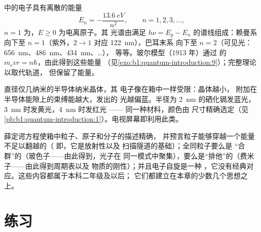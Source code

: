 \begin{proposition}[氢原子]\label{prop:b1:quantum-introduction:hydrogen}
中的电子具有离散的能量
\[
E_n = -\frac{\qty{13.6}{eV}}{n^2} , \qquad n = 1, 2, 3, \ldots ,
\]
$n = 1$ 为，$E \geq 0$ 为电离原子。其
光谱由满足 $h\nu = E_p - E_n$ 的谱线组成：赖曼系
向下至 $n = 1$（紫外，$2 \to 1$ 对应 \qty{122}{nm}），巴耳末系
向下至 $n = 2$（可见光：\qty{656}{nm}、\qty{486}{nm}、\qty{434}{nm}、\ldots），
等等。玻尔模型（1913 年）通过
的 $m_evr = n\hbar$，由此得到这些能量
（见\cref{exo:b1:quantum-introduction:9}）；完整理论以取代轨道，
但保留了能量。
\end{proposition}
\admitted

\begin{example}\label{ex:b1:quantum-introduction:dot}
直径仅几纳米的半导体纳米晶体，其
电子像在箱中一样受限：晶体越小，
附加在半导体能隙上的束缚能越大，发出的
光越偏蓝。半径为 \qty{2}{nm} 的硒化镉发蓝光，
\qty{3}{nm} 时发黄光，\qty{4}{nm} 时发红光 —— 同一种材料，颜色由
尺寸精确选定（见\cref{pb:b1:quantum-introduction:1}）。电视屏幕即利用此类。
\end{example}

\begin{remark}[理论其余部分的补充]\label{rem:b1:quantum-introduction:rest}
薛定谔方程使箱中粒子、原子和分子的描述精确，
并预言粒子能够穿越一个能量不足以翻越的（
即\emph{}，它是放射性以及
扫描隧道的基础）；全同粒子要么是
“合群”的（玻色子——由此得到\emph{}，光子在
同一模式中聚集），要么是“排他”的（费米子——由此得到周期表以及
物质的刚性）；并且电子自旋是一种
，它没有经典对应。这些内容都属于本科二年级及以后；
它们都建立在本章的少数几个思想之上。
\end{remark}

\section{练习}

